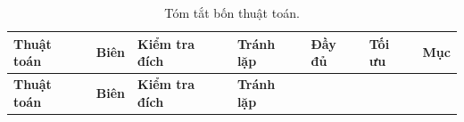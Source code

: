 \begin{longtable}[]{@{}
  >{\raggedright\arraybackslash}p{}
  >{\raggedright\arraybackslash}p{}
  >{\raggedright\arraybackslash}p{}
  >{\raggedright\arraybackslash}p{}
  >{\raggedright\arraybackslash}p{}
  >{\raggedright\arraybackslash}p{}
  >{\raggedright\arraybackslash}p{}@{}}
\caption{ Tóm tắt bốn thuật toán.}\tabularnewline
\toprule\noalign{}
\rowcolor{tablehead}\begin{minipage}[b]{\linewidth}\raggedright
\textbf{Thuật toán}
\end{minipage} & \begin{minipage}[b]{\linewidth}\raggedright
\textbf{Biên}
\end{minipage} & \begin{minipage}[b]{\linewidth}\raggedright
\textbf{Kiểm tra đích}
\end{minipage} & \begin{minipage}[b]{\linewidth}\raggedright
\textbf{Tránh lặp}
\end{minipage} & \begin{minipage}[b]{\linewidth}\raggedright
\textbf{Đầy đủ}
\end{minipage} & \begin{minipage}[b]{\linewidth}\raggedright
\textbf{Tối ưu}
\end{minipage} & \begin{minipage}[b]{\linewidth}\raggedright
\textbf{Mục}
\end{minipage} \\
\midrule\noalign{}
\endfirsthead
\toprule\noalign{}
\rowcolor{tablehead}\begin{minipage}[b]{\linewidth}\raggedright
\textbf{Thuật toán}
\end{minipage} & \begin{minipage}[b]{\linewidth}\raggedright
\textbf{Biên}
\end{minipage} & \begin{minipage}[b]{\linewidth}\raggedright
\textbf{Kiểm tra đích}
\end{minipage} & \begin{minipage}[b]{\linewidth}\raggedright
\textbf{Tránh lặp}
\end{minipage} & \begin{minipage}[b]{\linewidth}\raggedright

\end{minipage}
\end{longtable}

